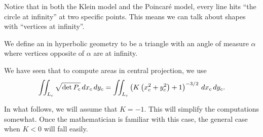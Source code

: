 \documentclass[newpage,hints,12pt,nooutcomes,noauthor,hints,handout]{ximera}
\begin{document}
Notice that in both the Klein model and the Poincar\'e model, every line hits
``the circle at infinity'' at two specific points.  This means we can talk about
shapes with ``vertices at infinity''.

\begin{definition}
  We define an  in hyperbolic geometry to be a
  triangle with an angle of measure $\alpha$ where vertices opposite of $\alpha$
  are at infinity.
\end{definition}

We have seen that to compute areas in central projection, we use
\[
  \iint_{L_c} \sqrt{\det P_c}\,d x_c\,d y_c
  =\iint_{L_c} \left(K\left(x_c^2+y_c^2\right)+1\right)^{-3/2} \,d x_c\,d y_c.
\]


In what follows, we will assume that $K=-1$. This will simplify the
computations somewhat. Once the mathematician is familiar with this
case, the general case when $K<0$ will fall easily.
\end{document}

